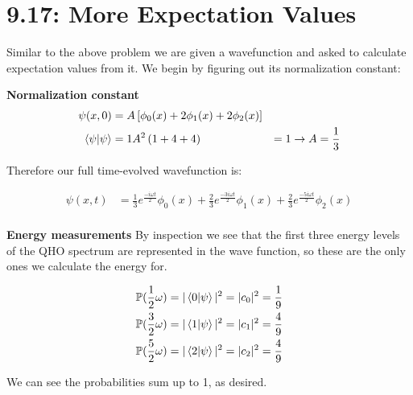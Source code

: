 \documentclass[10pt]{article} %
\begin{document}
\section{9.17: More Expectation Values}
Similar to the above problem we are given a wavefunction and asked to calculate expectation values
from it. We begin by figuring out its normalization constant:

\textbf{Normalization constant}
\begin{align*}
  \psi(x,0) &= A\left[\phi_0(x) + 2\phi_1(x) + 2\phi_2(x)\right]\\
  \braket{\psi} &= 1
  A^2\left(1 + 4 + 4\right) &= 1 \rightarrow A = \frac{1}{3}\\
\end{align*}

Therefore our full time-evolved wavefunction is:

\begin{align*}
  \psi(x,t) &= \frac{1}{3}e^{\frac{-i\omega t}{2}}\phi_0(x)
  + \frac{2}{3}e^{\frac{-3i\omega t}{2}}\phi_1(x)
  + \frac{2}{3}e^{\frac{-5i\omega t}{2}}\phi_2(x)\\
\end{align*}

\textbf{Energy measurements}
By inspection we see that the first three energy levels of the QHO spectrum are represented in the
wave function, so these are the only ones we calculate the energy for.

\begin{align*}
  \mathbb{P}(\frac{1}{2}\omega) &= |\bra{0}\ket{\psi}|^2 = |c_0|^2 = \frac{1}{9}\\
  \mathbb{P}(\frac{3}{2}\omega) &= |\bra{1}\ket{\psi}|^2 = |c_1|^2 = \frac{4}{9}\\
  \mathbb{P}(\frac{5}{2}\omega) &= |\bra{2}\ket{\psi}|^2 = |c_2|^2 = \frac{4}{9}\\
\end{align*}

We can see the probabilities sum up to 1, as desired.\\
\end{document}
